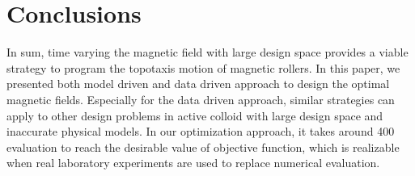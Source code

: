 \section{Conclusions}
In sum, time varying the  magnetic field with large design space provides a viable strategy to program the topotaxis motion of magnetic rollers. In this paper,  we presented both model driven and data driven approach to design the optimal magnetic fields. Especially for the data driven approach, similar strategies can apply to other design problems in active colloid with large design space and inaccurate physical models. In our optimization approach, it takes around 400 evaluation to reach the desirable value of objective function, which is realizable  when real laboratory experiments are used to replace numerical evaluation. 